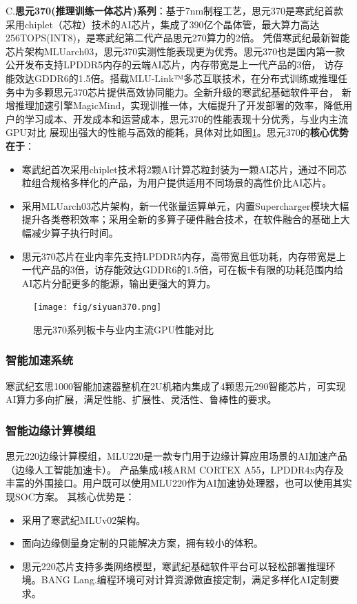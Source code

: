C.\textbf{思元370(推理训练一体芯片)系列}：基于7nm制程工艺，思元370是寒武纪首款采用chiplet（芯粒）技术的AI芯片，集成了390亿个晶体管，最大算力高达256TOPS(INT8)，是寒武纪第二代产品思元270算力的2倍。
凭借寒武纪最新智能芯片架构MLUarch03，思元370实测性能表现更为优秀。思元370也是国内第一款公开发布支持LPDDR5内存的云端AI芯片，内存带宽是上一代产品的3倍，
访存能效达GDDR6的1.5倍。搭载MLU-Link™多芯互联技术，在分布式训练或推理任务中为多颗思元370芯片提供高效协同能力。全新升级的寒武纪基础软件平台，
新增推理加速引擎MagicMind，实现训推一体，大幅提升了开发部署的效率，降低用户的学习成本、开发成本和运营成本，思元370的性能表现十分优秀，与业内主流GPU对比
展现出强大的性能与高效的能耗，具体对比如图\ref{siyuan370}。思元370的\textbf{核心优势在于}：
\begin{itemize}
  \item 寒武纪首次采用chiplet技术将2颗AI计算芯粒封装为一颗AI芯片，通过不同芯粒组合规格多样化的产品，为用户提供适用不同场景的高性价比AI芯片。
  \item 采用MLUarch03芯片架构，新一代张量运算单元，内置Supercharger模块大幅提升各类卷积效率；采用全新的多算子硬件融合技术，在软件融合的基础上大幅减少算子执行时间。
  \item 思元370芯片在业内率先支持LPDDR5内存，高带宽且低功耗，内存带宽是上一代产品的3倍，访存能效达GDDR6的1.5倍，可在板卡有限的功耗范围内给AI芯片分配更多的能源，输出更强大的算力。
\end{itemize}

\begin{figure}[!htb]
  \centering
  \texttt{[image: fig/siyuan370.png]}
  \caption{思元370系列板卡与业内主流GPU性能对比}
  \label{siyuan370}
\end{figure}

\subsubsection{智能加速系统}
寒武纪玄思1000智能加速器整机在2U机箱内集成了4颗思元290智能芯片，可实现AI算力多向扩展，满足性能、扩展性、灵活性、鲁棒性的要求。
\subsubsection{智能边缘计算模组}
思元220边缘计算模组，MLU220是一款专门用于边缘计算应用场景的AI加速产品（边缘人工智能加速卡）。
产品集成4核ARM CORTEX A55，LPDDR4x内存及丰富的外围接口。用户既可以使用MLU220作为AI加速协处理器，也可以使用其实现SOC方案。
其核心优势是：
\begin{itemize}
  \item 采用了寒武纪MLUv02架构。
  \item 面向边缘侧量身定制的只能解决方案，拥有较小的体积。
  \item 思元220芯片支持多类网络模型，寒武纪基础软件平台可以轻松部署推理环境。BANG Lang.编程环境可对计算资源做直接定制，满足多样化AI定制要求。
\end{itemize}
